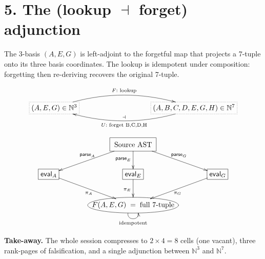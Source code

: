 \documentclass[11pt]{article}
\begin{document}
\section*{5. The (lookup $\dashv$ forget) adjunction}

The 3-basis $(A, E, G)$ is left-adjoint to the forgetful map that
projects a 7-tuple onto its three basis coordinates. The lookup is
idempotent under composition: forgetting then re-deriving recovers
the original 7-tuple.

\[
\xymatrix@C=10em@R=2em{
  *+[F.]{(A,E,G) \in \mathbb{N}^3}
  \ar@/^1.5pc/[r]^{F:\text{ lookup}}
  &
  *+[F.]{(A,B,C,D,E,G,H) \in \mathbb{N}^7}
    \ar@/^1.5pc/[l]^{U:\text{ forget B,C,D,H}}_{\dashv}
}
\]

\[
\xymatrix@C=4em@R=2.5em{
  & *++[F]{\text{Source AST}}
    \ar[dl]_{\mathsf{parse}_A}
    \ar[d]_{\mathsf{parse}_E}
    \ar[dr]^{\mathsf{parse}_G} & \\
  *+[F]{\mathsf{eval}_A}\ar[dr]_{\pi_A}
  & *+[F]{\mathsf{eval}_E}\ar[d]_{\pi_E}
  & *+[F]{\mathsf{eval}_G}\ar[dl]^{\pi_G} \\
  & *++[o][F]{F(A,E,G)\;=\;\text{full 7-tuple}}
    \ar@(dl,dr)[]_{\text{idempotent}}
}
\]

\medskip

\noindent\textbf{Take-away.} The whole session compresses to
$2\times 4 = 8$ cells (one vacant), three rank-pages of falsification,
and a single adjunction between $\mathbb{N}^3$ and $\mathbb{N}^7$.
\end{document}
